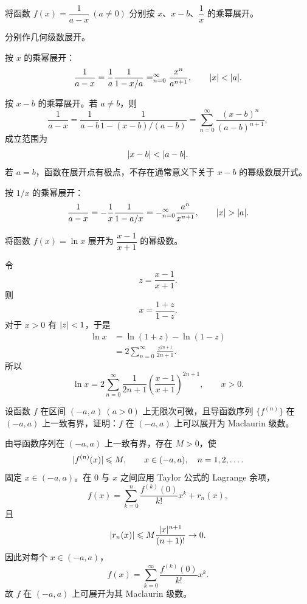 \begin{xexercise}[1]
将函数 $f(x)=\dfrac1{a-x}\ (a\ne0)$ 分别按 $x$、$x-b$、$\dfrac1x$ 的乘幂展开。
\end{xexercise}
\begin{xsolution}
分别作几何级数展开。

按 $x$ 的乘幂展开：
\[
  \frac1{a-x}=\frac1a\frac1{1-x/a}
  =\relax_{n=0}^{\infty}\frac{x^n}{a^{n+1}},
  \qquad \lvert x\rvert<\lvert a\rvert.
\]

按 $x-b$ 的乘幂展开。若 $a\ne b$，则
\[
  \frac1{a-x}
  =\frac1{a-b}\frac1{1-(x-b)/(a-b)}
  =\sum_{n=0}^{\infty}\frac{(x-b)^n}{(a-b)^{n+1}},
\]
成立范围为
\[
  \lvert x-b\rvert<\lvert a-b\rvert.
\]
若 $a=b$，函数在展开点有极点，不存在通常意义下关于 $x-b$ 的幂级数展开式。

按 $1/x$ 的乘幂展开：
\[
  \frac1{a-x}
  =-\frac1x\frac1{1-a/x}
  =-\relax_{n=0}^{\infty}\frac{a^n}{x^{n+1}},
  \qquad \lvert x\rvert>\lvert a\rvert.
\]
\end{xsolution}


\begin{xexercise}[2]
将函数 $f(x)=\ln x$ 展开为 $\dfrac{x-1}{x+1}$ 的幂级数。
\end{xexercise}
\begin{xsolution}
令
\[
  z=\frac{x-1}{x+1}.
\]
则
\[
  x=\frac{1+z}{1-z}.
\]
对于 $x>0$ 有 $\lvert z\rvert<1$，于是
\[
\begin{aligned}
  \ln x
  &=\ln(1+z)-\ln(1-z)\\
  &=2\sum_{n=0}^{\infty}\frac{z^{2n+1}}{2n+1}.
\end{aligned}
\]
所以
\[
  \boxed{
  \ln x=2\sum_{n=0}^{\infty}\frac1{2n+1}
  \left(\frac{x-1}{x+1}\right)^{2n+1}},
  \qquad x>0.
\]
\end{xsolution}


\begin{xexercise}[3]
设函数 $f$ 在区间 $(-a,a)\ (a>0)$ 上无限次可微，且导函数序列 $\{f^{(n)}\}$ 在 $(-a,a)$ 上一致有界，证明：$f$ 在 $(-a,a)$ 上可以展开为 Maclaurin 级数。
\end{xexercise}
\begin{xsolution}
由导函数序列在 $(-a,a)$ 上一致有界，存在 $M>0$，使
\[
  \lvert f^{(n)}(x)\rvert\leqslant M,
  \qquad x\in(-a,a),\quad n=1,2,\ldots.
\]
固定 $x\in(-a,a)$。在 $0$ 与 $x$ 之间应用 Taylor 公式的 Lagrange 余项，
\[
  f(x)=\sum_{k=0}^{n}\frac{f^{(k)}(0)}{k!}x^k+r_n(x),
\]
且
\[
  \lvert r_n(x)\rvert
  \leqslant M\frac{\lvert x\rvert^{n+1}}{(n+1)!}\to0.
\]
因此对每个 $x\in(-a,a)$，
\[
  f(x)=\sum_{k=0}^{\infty}\frac{f^{(k)}(0)}{k!}x^k.
\]
故 $f$ 在 $(-a,a)$ 上可展开为其 Maclaurin 级数。
\end{xsolution}



